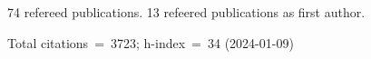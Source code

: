74 refereed publications. 13 refeered publications as first author.

Total citations~=~3723; h-index~=~34 (2024-01-09)